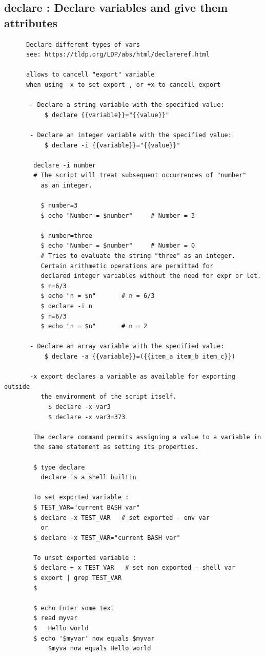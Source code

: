 \documentclass[a4paper,12pt]{article}
\begin{document}
\subsection{declare   : Declare variables and give them attributes }
\begin{verbatim}
      Declare different types of vars 
      see: https://tldp.org/LDP/abs/html/declareref.html      
       
      allows to cancell "export" variable  
      when using -x to set export , or +x to cancell export
    
       - Declare a string variable with the specified value:
           $ declare {{variable}}="{{value}}"

       - Declare an integer variable with the specified value:
           $ declare -i {{variable}}="{{value}}"

        declare -i number
        # The script will treat subsequent occurrences of "number"
          as an integer.		

          $ number=3
          $ echo "Number = $number"     # Number = 3

          $ number=three
          $ echo "Number = $number"     # Number = 0
          # Tries to evaluate the string "three" as an integer.
          Certain arithmetic operations are permitted for 
          declared integer variables without the need for expr or let.
          $ n=6/3
          $ echo "n = $n"       # n = 6/3
          $ declare -i n
          $ n=6/3
          $ echo "n = $n"       # n = 2

       - Declare an array variable with the specified value:
           $ declare -a {{variable}}=({{item_a item_b item_c}})

       -x export declares a variable as available for exporting outside 
          the environment of the script itself.
            $ declare -x var3
            $ declare -x var3=373

        The declare command permits assigning a value to a variable in 
        the same statement as setting its properties.

        $ type declare
          declare is a shell builtin
        
        To set exported variable :
        $ TEST_VAR="current BASH var"
        $ declare -x TEST_VAR   # set exported - env var     
          or  
        $ declare -x TEST_VAR="current BASH var"
        
        To unset exported variable :  
        $ declare + x TEST_VAR   # set non exported - shell var
        $ export | grep TEST_VAR
        $        

        $ echo Enter some text
        $ read myvar
        $   Hello world
        $ echo '$myvar' now equals $myvar 
            $myva now equals Hello world      

\end{verbatim}
\end{document}
